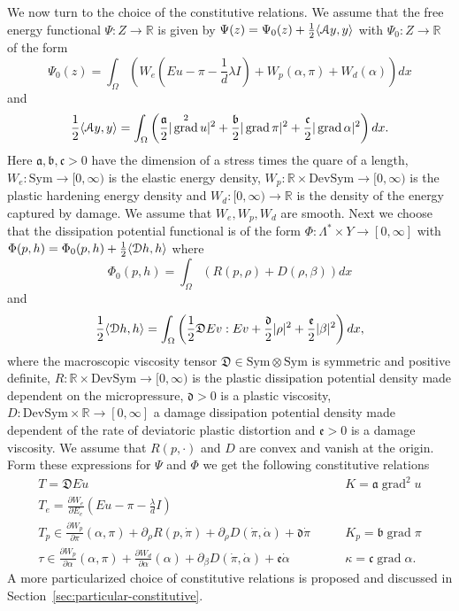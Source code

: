 \documentclass[a4paper,10pt,oneside]{amsbook}
\numberwithin{section}{chapter}
\numberwithin{equation}{chapter}
\theoremstyle{definition}
\DeclareMathOperator{\grad}{grad}
\DeclarePairedDelimiter{\dual}{\langle}{\rangle}
\newcommand{\dind}[2]{\frac{\partial #1}{\partial #2}}
\begin{document}
We now turn to the choice of the constitutive relations. We assume that the free energy functional $\Psi\colon Z\to\mathbb{R}$ is given by $\Psi(z)=\Psi_0(z)+\frac{1}{2}\dual{\mathcal{A}y,y}$ with $\Psi_0\colon Z\to\mathbb{R}$ of the form
\[
\Psi_0(z)=\int_\Omega\left(W_e\left(Eu-\pi-\frac{1}{d}\lambda I\right)+W_p(\alpha,\pi)+W_d(\alpha)\right)dx
\]
and
\begin{equation}
\label{eqn:energy-gradients}
\frac{1}{2}\dual{\mathcal{A}y,y}=\int_\Omega\left(\frac{\mathfrak{a}}{2}|\grad^2u|^2+\frac{\mathfrak{b}}{2}|\grad\pi|^2+\frac{\mathfrak{c}}{2}|\grad\alpha|^2\right)dx.
\end{equation}
Here $\mathfrak{a},\mathfrak{b},\mathfrak{c}>0$ have the dimension of a stress times the quare of a length, $W_e\colon\text{Sym}\to[0,\infty)$ is the elastic energy density, $W_p\colon\mathbb{R}\times\text{DevSym}\to[0,\infty)$ is the plastic hardening energy density and $W_d\colon[0,\infty)\to\mathbb{R}$ is the density of the energy captured by damage. We assume that $W_e,W_p,W_d$ are smooth. Next we choose that the dissipation potential functional is of the form $\Phi\colon\Lambda^*\times Y\to[0,\infty]$ with $\Phi(p,h)=\Phi_0(p,h)+\frac{1}{2}\dual{\mathcal{D}h,h}$ where
\[
\Phi_0(p,h)=\int_\Omega\left(R(p,\rho)+D(\rho,\beta)\right)dx
\]
and
\[
\frac{1}{2}\dual{\mathcal{D}h,h}=\int_\Omega\left(\frac{1}{2}\mathfrak{D}Ev:Ev+\frac{\mathfrak{d}}{2}|\rho|^2+\frac{\mathfrak{e}}{2}|\beta|^2\right)dx,
\]
where the macroscopic viscosity tensor $\mathfrak{D}\in\text{Sym}\otimes\text{Sym}$ is symmetric and positive definite, $R\colon\mathbb{R}\times\text{DevSym}\to[0,\infty)$ is the plastic dissipation potential density made dependent on the micropressure, $\mathfrak{d}>0$ is a plastic viscosity, $D\colon\text{DevSym}\times\mathbb{R}\to[0,\infty]$ a damage dissipation potential density made dependent of the rate of deviatoric plastic distortion and $\mathfrak{e}>0$ is a damage viscosity. We assume that $R(p,\cdot)$ and $D$ are convex and vanish at the origin. Form these expressions for $\Psi$ and $\Phi$ we get the following constitutive relations
\begin{align}
T=\mathfrak{D}E\dot u\qquad & K=\mathfrak{a}\grad^2u \\
T_e=\dind{W_e}{E_e}\left(Eu-\pi-\frac{\lambda}{d}I\right)\qquad & \\
T_p\in\dind{W_p}{\pi}(\alpha,\pi)+\partial_\rho R(p,\dot\pi)+\partial_\rho D(\dot\pi,\dot\alpha)+\mathfrak{d}\dot\pi\qquad & K_p=\mathfrak{b}\grad\pi \\
\tau\in \dind{W_p}{\alpha}(\alpha,\pi)+\dind{W_d}{\alpha}(\alpha)+\partial_\beta D(\dot\pi,\dot\alpha)+\mathfrak{e}\dot\alpha\qquad & \kappa=\mathfrak{c}\grad\alpha.
\end{align}
A more particularized choice of constitutive relations is proposed and discussed in Section~\ref{sec:particular-constitutive}.
\end{document}
